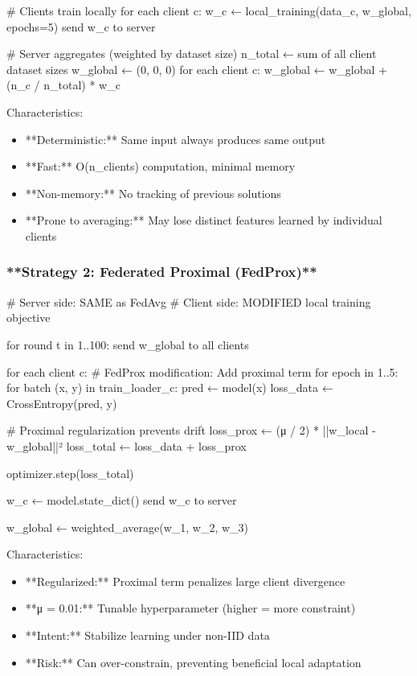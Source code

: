     \# Clients train locally
    for each client c:
        w\_c ← local\_training(data\_c, w\_global, epochs=5)
        send w\_c to server
    
    \# Server aggregates (weighted by dataset size)
    n\_total ← sum of all client dataset sizes
    w\_global ← (0, 0, 0)
    for each client c:
        w\_global ← w\_global + (n\_c / n\_total) * w\_c

Characteristics:

\begin{itemize}
  \item **Deterministic:** Same input always produces same output
  \item **Fast:** O(n\_clients) computation, minimal memory
  \item **Non-memory:** No tracking of previous solutions
  \item **Prone to averaging:** May lose distinct features learned by individual clients
\end{itemize}


\subsubsection{**Strategy 2: Federated Proximal (FedProx)**}
\# Server side: SAME as FedAvg
\# Client side: MODIFIED local training objective

for round t in 1..100:
    send w\_global to all clients
    
    for each client c:
        \# FedProx modification: Add proximal term
        for epoch in 1..5:
            for batch (x, y) in train\_loader\_c:
                pred ← model(x)
                loss\_data ← CrossEntropy(pred, y)
                
                \# Proximal regularization prevents drift
                loss\_prox ← (μ / 2) * ||w\_local - w\_global||²
                loss\_total ← loss\_data + loss\_prox
                
                optimizer.step(loss\_total)
        
        w\_c ← model.state\_dict()
        send w\_c to server
    
    w\_global ← weighted\_average(w\_1, w\_2, w\_3)

Characteristics:

\begin{itemize}
  \item **Regularized:** Proximal term penalizes large client divergence
  \item **μ = 0.01:** Tunable hyperparameter (higher = more constraint)
  \item **Intent:** Stabilize learning under non-IID data
  \item **Risk:** Can over-constrain, preventing beneficial local adaptation
\end{itemize}


